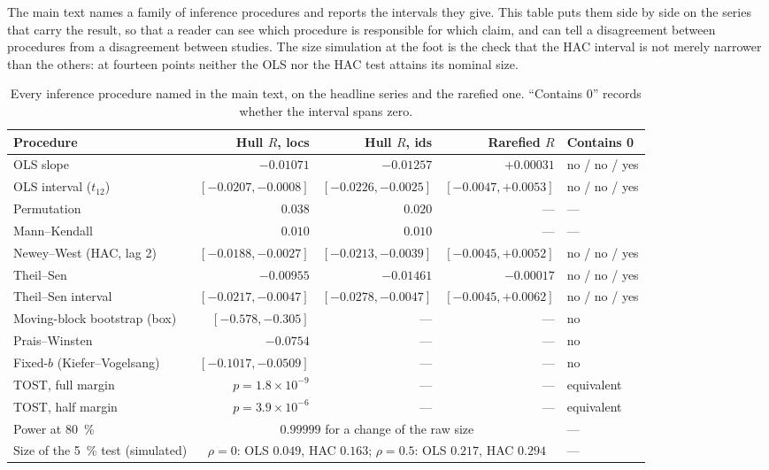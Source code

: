 \documentclass[fleqn,10pt]{wlpeerj}
\begin{document}
The main text names a family of inference procedures and reports the intervals they give. This
table puts them side by side on the series that carry the result, so that a reader can see which
procedure is responsible for which claim, and can tell a disagreement between procedures from a
disagreement between studies. The size simulation at the foot is the check that the HAC interval
is not merely narrower than the others: at fourteen points neither the OLS nor the HAC test
attains its nominal size.

\begin{table}[H]
\centering
\caption{Every inference procedure named in the main text, on the headline series and the
rarefied one. ``Contains 0'' records whether the interval spans zero.}
\label{si:procs}
\footnotesize
\setlength{\tabcolsep}{3pt}
\begin{adjustbox}{max width=\linewidth}
\begin{tabular}{p{3.3cm}rrrp{1.4cm}}
\toprule
Procedure & \multicolumn{1}{p{1.6cm}}{Hull $R$, locs} & \multicolumn{1}{p{1.6cm}}{Hull $R$, ids} & \multicolumn{1}{p{1.6cm}}{Rarefied $R$} & Contains 0 \\
\midrule
OLS slope & $-0.01071$ & $-0.01257$ & $+0.00031$ & no / no / yes \\
OLS interval ($t_{12}$) & $[-0.0207,-0.0008]$ & $[-0.0226,-0.0025]$ & $[-0.0047,+0.0053]$ & no / no / yes \\
Permutation & $0.038$ & $0.020$ & --- & --- \\
Mann--Kendall & $0.010$ & $0.010$ & --- & --- \\
Newey--West (HAC, lag 2) & $[-0.0188,-0.0027]$ & $[-0.0213,-0.0039]$ & $[-0.0045,+0.0052]$ & no / no / yes \\
Theil--Sen & $-0.00955$ & $-0.01461$ & $-0.00017$ & no / no / yes \\
Theil--Sen interval & $[-0.0217,-0.0047]$ & $[-0.0278,-0.0047]$ & $[-0.0045,+0.0062]$ & no / no / yes \\
Moving-block bootstrap (box) & $[-0.578,-0.305]$ & --- & --- & no \\
Prais--Winsten & $-0.0754$ & --- & --- & no \\
Fixed-$b$ (Kiefer--Vogelsang) & $[-0.1017,-0.0509]$ & --- & --- & no \\
TOST, full margin & $p = 1.8\times10^{-9}$ & --- & --- & equivalent \\
TOST, half margin & $p = 3.9\times10^{-6}$ & --- & --- & equivalent \\
Power at \SI{80}{\percent} & \multicolumn{3}{c}{$0.99999$ for a change of the raw size} & --- \\
\midrule
Size of the \SI{5}{\percent} test (simulated) & \multicolumn{3}{c}{$\rho = 0$: OLS $0.049$, HAC $0.163$; $\rho = 0.5$: OLS $0.217$, HAC $0.294$} & --- \\
\bottomrule
\end{tabular}
\end{adjustbox}
\end{table}
\end{document}
